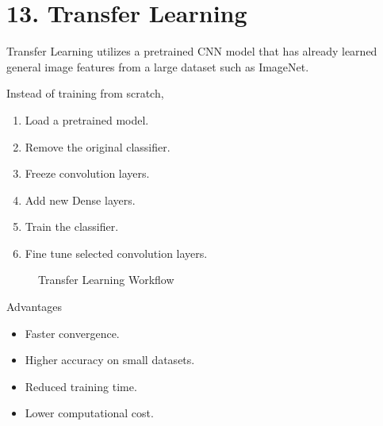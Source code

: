 \documentclass[11pt]{article}
\begin{document}

\section*{13. Transfer Learning}

Transfer Learning utilizes a pretrained CNN model that has already learned
general image features from a large dataset such as ImageNet.

Instead of training from scratch,

\begin{enumerate}
\item Load a pretrained model.
\item Remove the original classifier.
\item Freeze convolution layers.
\item Add new Dense layers.
\item Train the classifier.
\item Fine tune selected convolution layers.
\end{enumerate}

\begin{figure}[H]

\centering


\caption{Transfer Learning Workflow}

\end{figure}

Advantages

\begin{itemize}
\item Faster convergence.
\item Higher accuracy on small datasets.
\item Reduced training time.
\item Lower computational cost.
\end{itemize}
\end{document}
